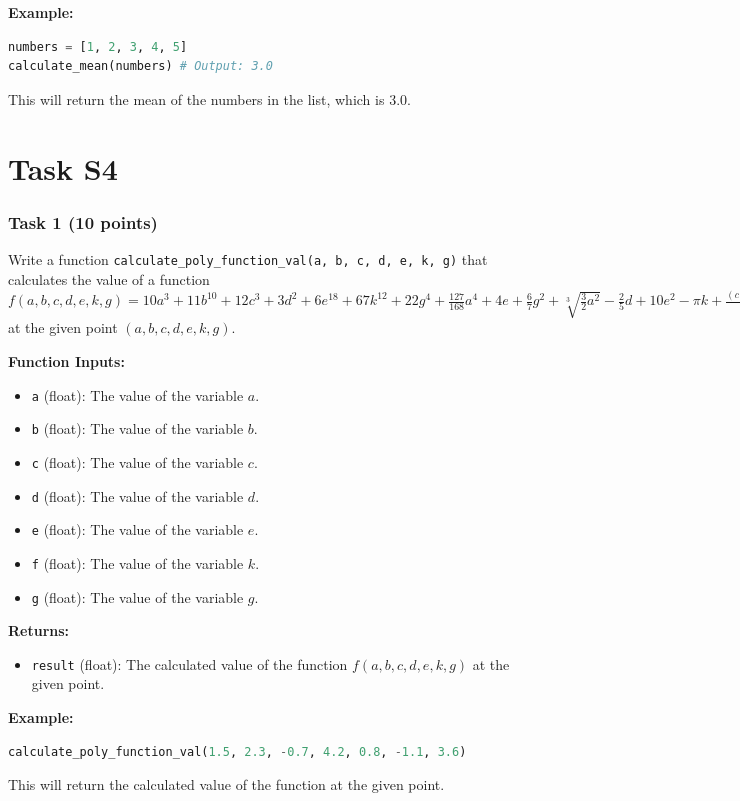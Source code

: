 \documentclass[12pt]{book}
\begin{document}
\textbf{Example:}
\begin{lstlisting}[language=Python]
numbers = [1, 2, 3, 4, 5]
calculate_mean(numbers) # Output: 3.0
\end{lstlisting}
This will return the mean of the numbers in the list, which is 3.0.


\newpage

\section{Task S4}

\subsubsection{Task 1 (10 points)}
Write a function \texttt{calculate\_poly\_function\_val(a, b, c, d, e, k, g)} that calculates the value of a function $f(a, b, c, d, e, k, g) = 10a^3 + 11b^{10} + 12c^3 + 3d^2 + 6e^{18} + 67k^{12} + 22g^4 + \frac{127}{168}a^4 + 4e + \frac{6}{7}g^2 + \sqrt[3]{\frac{3}{2}a^2} - \frac{2}{5}d + 10e^2 - \pi k + \frac{(c + d + k + g)a^2}{b}$ at the given point $(a, b, c, d, e, k, g)$.

\textbf{Function Inputs:}
\begin{itemize}
\item \texttt{a} (float): The value of the variable $a$.
\item \texttt{b} (float): The value of the variable $b$.
\item \texttt{c} (float): The value of the variable $c$.
\item \texttt{d} (float): The value of the variable $d$.
\item \texttt{e} (float): The value of the variable $e$.
\item \texttt{f} (float): The value of the variable $k$.
\item \texttt{g} (float): The value of the variable $g$.
\end{itemize}

\textbf{Returns:}
\begin{itemize}
\item \texttt{result} (float): The calculated value of the function $f(a, b, c, d, e, k, g)$ at the given point.
\end{itemize}

\textbf{Example:}
\begin{lstlisting}[language=Python]
calculate_poly_function_val(1.5, 2.3, -0.7, 4.2, 0.8, -1.1, 3.6)
\end{lstlisting}
This will return the calculated value of the function at the given point.
\end{document}
